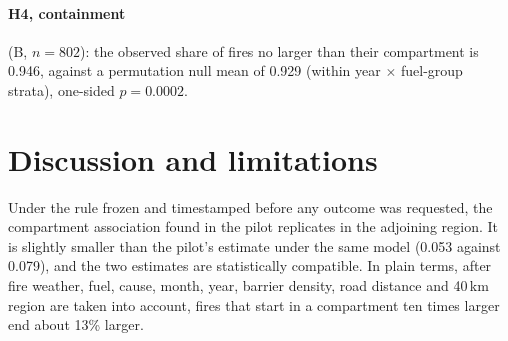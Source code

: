 \documentclass[11pt]{article}
\begin{document}
\paragraph{H4, containment} (B, $n=802$): the observed share of fires no larger than their compartment is 0.946, against a permutation null mean of 0.929
(within year $\times$ fuel-group strata), one-sided $p=0.0002$.

\section{Discussion and limitations}
Under the rule frozen and timestamped before any outcome was requested, the compartment association found in the pilot replicates in the
adjoining region. It is slightly smaller than the pilot's estimate under the same model (0.053 against 0.079), and the two estimates are statistically compatible.
In plain terms, after fire weather, fuel, cause, month, year, barrier density, road distance and 40\,km region are taken into account, fires that
start in a compartment ten times larger end about 13\% larger.
\end{document}
